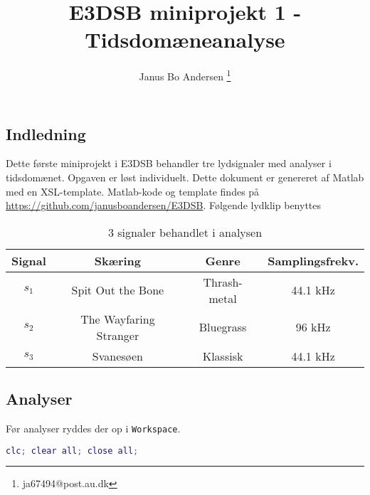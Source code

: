 \documentclass[a4paper]{report}
\author{Janus Bo Andersen \thanks{ja67494@post.au.dk}}
\begin{document}


    
    
    \title{E3DSB miniprojekt 1 - Tidsdomæneanalyse}
        

    \maketitle

\tableofcontents
\newpage


    \begin{par}

\chapter{Indledning}
Dette første miniprojekt i E3DSB behandler tre lydsignaler med analyser i tidsdomænet.
Opgaven er løst individuelt.
Dette dokument er genereret af Matlab med en XSL-template.
Matlab-kode og template findes på \url{https://github.com/janusboandersen/E3DSB}.
Følgende lydklip benyttes \\
\begin{table}[H]
\centering
\begin{tabular}{| c | c | c | c |} \hline
Signal & Skæring & Genre & Samplingsfrekv. \\ \hline
$s_1$ & Spit Out the Bone & Thrash-metal & 44.1 \si{\kilo\hertz} \\ \hline
$s_2$ & The Wayfaring Stranger & Bluegrass & 96 \si{\kilo\hertz} \\ \hline
$s_3$ & Svanesøen & Klassisk & 44.1 \si{\kilo\hertz} \\ \hline
\end{tabular}\caption{3 signaler behandlet i analysen}\label{tab:lydklip}\end{table}

\end{par} 
\begin{par}

\chapter{Analyser}
Før analyser ryddes der op i \texttt{Workspace}.\\

\end{par} 

\begin{lstlisting}[language=Matlab, style=Matlab-editor]
clc; clear all; close all;
\end{lstlisting}
\end{document}
